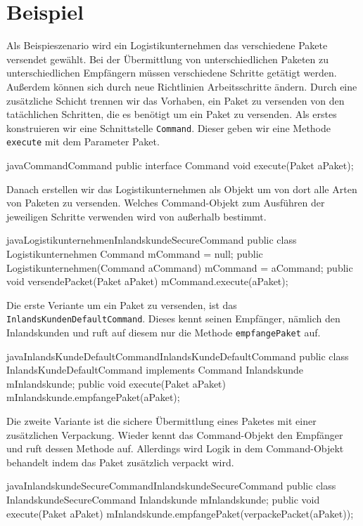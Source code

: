 \section{Beispiel}

Als  Beispieszenario wird  ein Logistikunternehmen das verschiedene Pakete versendet gewählt. Bei der Übermittlung von unterschiedlichen Paketen zu unterschiedlichen Empfängern müssen verschiedene Schritte getätigt werden. Außerdem können sich durch neue Richtlinien Arbeitsschritte ändern. 
Durch eine zusätzliche Schicht trennen wir das Vorhaben, ein Paket zu versenden von den tatächlichen Schritten, die es benötigt um ein Paket zu versenden. 
Als erstes konstruieren wir eine Schnittstelle \texttt{Command}. Dieser geben wir eine Methode \texttt{execute} mit dem Parameter Paket. 

\begin{beispiel}{java}{Command}{Command}
public interface Command {
    void execute(Paket aPaket);
}
\end{beispiel}

Danach erstellen wir das Logistikunternehmen als Objekt um von dort alle Arten von Paketen zu versenden. Welches Command-Objekt zum Ausführen der jeweiligen Schritte verwenden wird von außerhalb bestimmt.

\begin{beispiel}{java}{Logistikunternehmen}{InlandskundeSecureCommand}
public class Logistikunternehmen {
    Command mCommand = null;
    public Logistikunternehmen(Command aCommand){
        mCommand = aCommand;
    }
    public void versendePacket(Paket aPaket){
        mCommand.execute(aPaket);
    }
}
\end{beispiel}

Die erste Veriante um ein Paket zu versenden, ist das \texttt{InlandsKundenDefaultCommand}. Dieses kennt seinen Empfänger, nämlich den Inlandskunden und ruft auf diesem nur die Methode \texttt{empfangePaket} auf.

\begin{beispiel}{java}{InlandsKundeDefaultCommand}{InlandsKundeDefaultCommand}
public class InlandsKundeDefaultCommand implements Command{
    Inlandskunde mInlandskunde;
    public void execute(Paket aPaket) {
        mInlandskunde.empfangePaket(aPaket);
    }
}
\end{beispiel}

Die zweite Variante ist die sichere Übermittlung eines Paketes mit einer zusätzlichen Verpackung. Wieder kennt das Command-Objekt den Empfänger und ruft dessen Methode auf. Allerdings wird Logik in dem Command-Objekt behandelt indem das Paket zusätzlich verpackt wird.

\begin{beispiel}{java}{InlandskundeSecureCommand}{InlandskundeSecureCommand}
public class InlandskundeSecureCommand {
    Inlandskunde mInlandskunde;
    public void execute(Paket aPaket) {
        mInlandskunde.empfangePaket(verpackePacket(aPaket));
    }
}
\end{beispiel}

